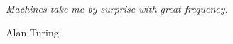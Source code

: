 \documentclass[a4paper, 11pt]{Thesis}  %
\begin{document}
 
 
 
 
 
 

\pagestyle{empty}  %

\null\vfill
\textit{Machines take me by surprise with great frequency.} 

\begin{flushright}
Alan Turing.
\end{flushright}

\vfill\vfill\vfill\vfill\vfill\vfill\null
\clearpage  %
\end{document}

